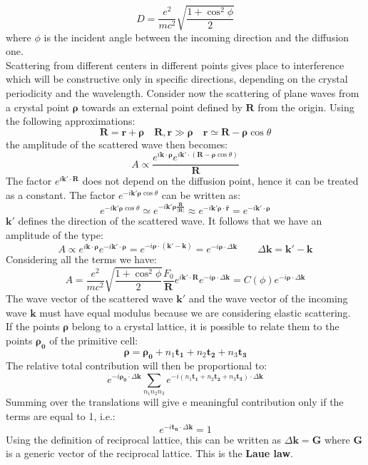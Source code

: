 \documentclass[10.75pt,a4paper,openright,bottom=2cm]{article}
\renewcommand{\Vec}[1]{\boldsymbol{#1}}
\begin{document}
\[
D=\frac{e^2}{mc^2}\sqrt{\frac{1+\cos^2\phi}{2}}
\]
where $\phi$ is the incident angle between the incoming direction and the diffusion one.\\
Scattering from different centers in different points gives place to interference which will be constructive only in specific directions, depending on the crystal periodicity and the wavelength. Consider now the scattering of plane waves from a crystal point $\Vec{\rho}$ towards an external point defined by $\Vec{R}$ from the origin. Using the following approximations:
\[
\Vec{R}=\Vec{r}+\Vec{\rho} \quad \Vec{R},\Vec{r}\gg\Vec{\rho} \quad \Vec{r}\simeq\Vec{R}-\Vec{\rho}\cos\theta
\]
the amplitude of the scattered wave then becomes:
\[
A\propto\frac{e^{i\Vec{k}\cdot\Vec{\rho}}e^{i\Vec{k'}\cdot(\Vec{R}-\Vec{\rho}\cos\theta)}}{\Vec{R}}
\]
The factor $e^{i\Vec{k'}\cdot\Vec{R}}$ does not depend on the diffusion point, hence it can be treated as a constant. The factor $e^{-i\Vec{k'}\Vec{\rho}\cos\theta}$ can be written as:
\[
e^{-i\Vec{k'}\Vec{\rho}\cos\theta}\simeq e^{-i\Vec{k'}\Vec{\rho}\frac{\Vec{R}}{|\Vec{R}|}}\approx e^{-i\Vec{k'}\Vec{\rho}\cdot\Vec{\hat{r}}}=e^{-i\Vec{k'}\cdot\Vec{\rho}}
\]
$\Vec{k'}$ defines the direction of the scattered wave. It follows that we have an amplitude of the type:
\[
A\propto e^{i\Vec{k}\cdot\Vec{\rho}}e^{-i\Vec{k}'\cdot\Vec{\rho}}=e^{-i\Vec{\rho}\cdot(\Vec{k}'-\Vec{k})}=e^{-i\Vec{\rho}\cdot\Delta\Vec{k}} \qquad \Delta\Vec{k}=\Vec{k}'-\Vec{k}
\]
Considering all the terms we have:
\[
A=\frac{e^2}{mc^2}\sqrt{\frac{1+\cos^2\phi}{2}}\frac{F_0}{\Vec{R}}e^{i\Vec{k'}\cdot\Vec{R}}e^{-i\Vec{\rho}\cdot\Delta\Vec{k}}=C(\phi)e^{-i\Vec{\rho}\cdot\Delta\Vec{k}}
\]
The wave vector of the scattered wave $\Vec{k'}$ and the wave vector of the incoming wave $\Vec{k}$ must have equal modulus because we are considering elastic scattering.\\
If the points $\Vec{\rho}$ belong to a crystal lattice, it is possible to relate them to the points $\Vec{\rho_0}$ of the primitive cell:
\[
\Vec{\rho}=\Vec{\rho_0}+n_1\Vec{t_1}+n_2\Vec{t_2}+n_3\Vec{t_3}
\]
The relative total contribution will then be proportional to:
\begin{equation}
\label{rhozero}
e^{-i\Vec{\rho_0}\cdot\Delta\Vec{k}}\sum_{n_1n_2n_3}e^{-i(n_1\Vec{t_1}+n_2\Vec{t_2}+n_3\Vec{t_3})\cdot\Delta\Vec{k}}
\end{equation}
Summing over the translations will give e meaningful contribution only if the terms are equal to 1, i.e.:
\[
e^{-i\Vec{t_n}\cdot\Delta\Vec{k}}=1
\]
Using the definition of reciprocal lattice, this can be written as $\Delta\Vec{k}=\Vec{G}$ where $\Vec{G}$ is a generic vector of the reciprocal lattice. This is the \textbf{Laue law}.\\
\end{document}
